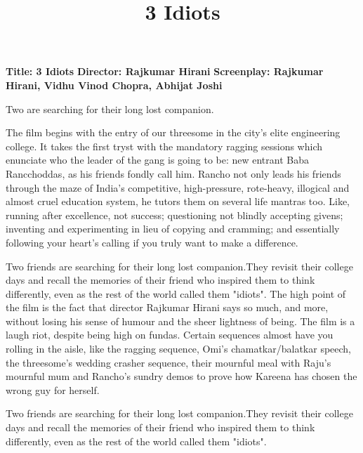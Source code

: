 \documentclass[10.5pt, a4paper]{article}
\title{3 Idiots}
\begin{document}
\maketitle
\textbf{Title: 3 Idiots}
\textbf{Director: Rajkumar Hirani}
\textbf{Screenplay: Rajkumar Hirani, Vidhu Vinod Chopra, Abhijat Joshi}

Two  are searching for their long lost companion.

The film begins with the entry of our threesome in the city's elite engineering college.
 It takes the first tryst with the mandatory ragging sessions which enunciate who the leader
 of the gang is going to be: new entrant Baba Rancchoddas, as his friends fondly call him. Rancho not only leads
 his friends through the maze of India's competitive, high-pressure, rote-heavy, illogical and almost cruel
 education system, he tutors them on several life mantras too. Like, running after excellence, not success;
 questioning not blindly accepting givens; inventing and experimenting in lieu of copying and cramming;
 and essentially following your heart's calling if you truly want to make
 a difference.

Two friends are searching for their long lost companion.They revisit their college days 
and recall the memories of their friend who inspired them to think differently, 
even as the rest of the world called them "idiots". 
The high point of the film is the fact that director Rajkumar Hirani says so much, and more, without losing his sense of humour and the sheer lightness of being. The film is a laugh riot, despite being high on fundas. Certain sequences almost have you rolling in the aisle, like the ragging sequence, Omi's chamatkar/balatkar speech, the threesome's wedding crasher sequence, their mournful meal with Raju's mournful mum and Rancho's sundry demos to prove how Kareena has chosen the wrong guy for herself.

Two friends are searching for their long lost companion.They revisit their college days 
and recall the memories of their friend who inspired them to think differently, 
even as the rest of the world called them "idiots". 
\end{document}
